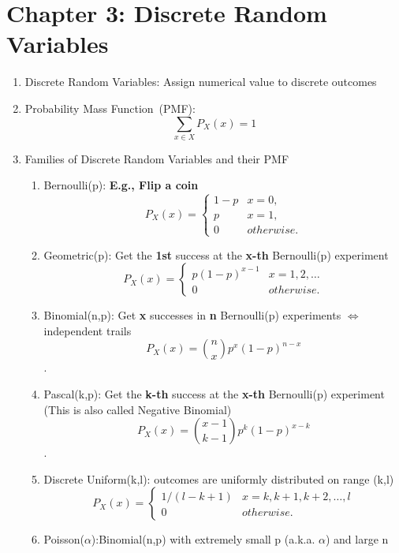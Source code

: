 \section*{Chapter 3: Discrete Random Variables}
\begin{enumerate}
    \item Discrete Random Variables: Assign numerical value to discrete outcomes
    \item Probability Mass Function~(PMF): $$\sum_{x\in X}P_X(x)=1$$ 
    \item Families of Discrete Random Variables and their PMF{
        \begin{enumerate}
            \item Bernoulli(p): \textbf{E.g., Flip a coin}{
                \[ P_X(x) = 
                \begin{cases}
                    1-p & x=0, \\
                    p   & x=1, \\
                    0   & otherwise.
                \end{cases} \]
            }
            \item Geometric(p): Get the \textbf{1st} success at the \textbf{x-th} Bernoulli(p) experiment {
                \[ P_X(x) = 
                \begin{cases}
                    p(1-p)^{x-1} & x=1,2,\ldots \\
                    0   & otherwise.
                \end{cases} \]
            }
            \item Binomial(n,p): Get \textbf{x} successes in \textbf{n} Bernoulli(p) experiments $\iff$ independent trails{
                $$P_X(x) = \binom{n}{x}p^x(1-p)^{n-x}$$.
            }
            \item Pascal(k,p): Get the \textbf{k-th} success at the \textbf{x-th} Bernoulli(p) experiment (This is also called Negative Binomial) {
                $$P_X(x) = \binom{x-1}{k-1}p^k(1-p)^{x-k}$$.
            }
            \item Discrete Uniform(k,l): outcomes are uniformly distributed on range (k,l) {
                \[ P_X(x) = 
                \begin{cases}
                    1/(l-k+1)   & x=k,k+1,k+2,\ldots,l \\
                    0   & otherwise.
                \end{cases} \]
            }
            \item Poisson($\alpha$):Binomial(n,p) with extremely small p (a.k.a. $\alpha$) and large n{
}
\end{enumerate}}
\end{enumerate}
